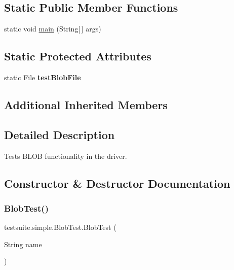 \subsection*{Static Public Member Functions}
\begin{DoxyCompactItemize}
\item 
static void \mbox{\hyperlink{classtestsuite_1_1simple_1_1_blob_test_afda9a3e28dbbf808702dcf118e046ec6}{main}} (String\mbox{[}$\,$\mbox{]} args)
\end{DoxyCompactItemize}
\subsection*{Static Protected Attributes}
\begin{DoxyCompactItemize}
\item 
\mbox{\label{classtestsuite_1_1simple_1_1_blob_test_ad34fd4e4b861e58833e6ca9697db35bb}} 
static File {\bfseries test\+Blob\+File}
\end{DoxyCompactItemize}
\subsection*{Additional Inherited Members}


\subsection{Detailed Description}
Tests B\+L\+OB functionality in the driver. 

\subsection{Constructor \& Destructor Documentation}
\mbox{\label{classtestsuite_1_1simple_1_1_blob_test_a2741df6da9d07c3c6b8ba36abf15bc86}} 
\subsubsection{\texorpdfstring{Blob\+Test()}{BlobTest()}}
{\footnotesize\ttfamily testsuite.\+simple.\+Blob\+Test.\+Blob\+Test (\begin{DoxyParamCaption}\item[{String}]{name }\end{DoxyParamCaption})}

